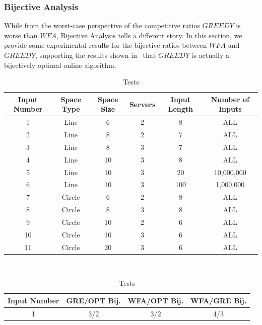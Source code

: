 \subsubsection*{Bijective Analysis}
While from the worst-case perspective of the competitive ratios $GREEDY$ is worse than $WFA$, Bijective Analysis tells a different story. In this section, we provide some experimental results for the bijective ratios between $WFA$ and $GREEDY$, supporting the results shown in~\cite{bij2016} that $GREEDY$ is actually a bijectively optimal online algorithm.


\begin{table}[!htb]
    \begin{minipage}{.5\linewidth}
      \centering
      \begin{tabular}{|c|c|c|c|c|c|}
        \hline
        Input Number & Space Type & Space Size & Servers & Input Length & Number of Inputs\\
        \hline
        1 & Line & 6 & 2 & 8 & ALL \\
        \hline
        2 & Line & 8 & 2 & 7 & ALL \\
        \hline
        3 & Line & 8 & 3 & 7 & ALL\\
        \hline
        4 & Line & 10 & 3 & 8 & ALL\\
        \hline
        5 & Line & 10 & 3 & 20 & 10,000,000\\
        \hline
        6 & Line & 10 & 3 & 100 & 1,000,000\\
        \hline 
        7 & Circle & 6 & 2 & 8 & ALL\\
        \hline
        8 & Circle & 8 & 3 & 8 & ALL\\
        \hline
        9 & Circle & 10 & 2 & 6 & ALL\\
        \hline
        10 & Circle & 10 & 3 & 6 & ALL\\
        \hline
        11 & Circle & 20 & 3 & 6 & ALL \\
        \hline
    \end{tabular}
        \caption{Tests}
        \label{tab:tests}
    \end{minipage}%
    \\
    \begin{minipage}{.5\linewidth}
        \centering
        \begin{tabular}{|c|c|c|c|}
          \hline
          Input Number & GRE/OPT Bij. & WFA/OPT Bij. & WFA/GRE Bij.\\
          \hline
          1 & 3/2 & 3/2 & 4/3\\

\end{tabular}
\end{minipage}
\end{table}
